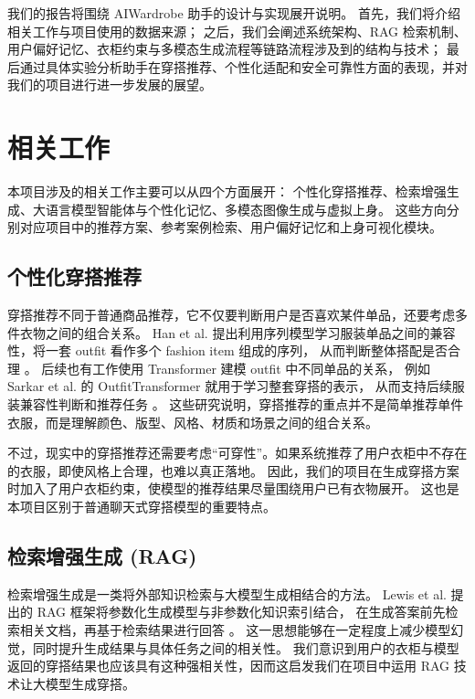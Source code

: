 \documentclass{applemlr}
\begin{document}
我们的报告将围绕 AIWardrobe 助手的设计与实现展开说明。
首先，我们将介绍相关工作与项目使用的数据来源；
之后，我们会阐述系统架构、RAG 检索机制、用户偏好记忆、衣柜约束与多模态生成流程等链路流程涉及到的结构与技术；
最后通过具体实验分析助手在穿搭推荐、个性化适配和安全可靠性方面的表现，并对我们的项目进行进一步发展的展望。


\section{相关工作}

本项目涉及的相关工作主要可以从四个方面展开：
个性化穿搭推荐、检索增强生成、大语言模型智能体与个性化记忆、多模态图像生成与虚拟上身。
这些方向分别对应项目中的推荐方案、参考案例检索、用户偏好记忆和上身可视化模块。

\subsection{个性化穿搭推荐}

穿搭推荐不同于普通商品推荐，它不仅要判断用户是否喜欢某件单品，还要考虑多件衣物之间的组合关系。
Han et al. 提出利用序列模型学习服装单品之间的兼容性，将一套 outfit 看作多个 fashion item 组成的序列，
从而判断整体搭配是否合理 \citep{han2017learning}。
后续也有工作使用 Transformer 建模 outfit 中不同单品的关系，
例如 Sarkar et al. 的 OutfitTransformer 就用于学习整套穿搭的表示，
从而支持后续服装兼容性判断和推荐任务 \citep{sarkar2023outfittransformer}。
这些研究说明，穿搭推荐的重点并不是简单推荐单件衣服，而是理解颜色、版型、风格、材质和场景之间的组合关系。

不过，现实中的穿搭推荐还需要考虑“可穿性”。如果系统推荐了用户衣柜中不存在的衣服，即使风格上合理，也难以真正落地。
因此，我们的项目在生成穿搭方案时加入了用户衣柜约束，使模型的推荐结果尽量围绕用户已有衣物展开。
这也是本项目区别于普通聊天式穿搭模型的重要特点。

\subsection{检索增强生成 (RAG)}

检索增强生成是一类将外部知识检索与大模型生成相结合的方法。
Lewis et al. 提出的 RAG 框架将参数化生成模型与非参数化知识索引结合，
在生成答案前先检索相关文档，再基于检索结果进行回答 \citep{lewis2020retrieval}。
这一思想能够在一定程度上减少模型幻觉，同时提升生成结果与具体任务之间的相关性。
我们意识到用户的衣柜与模型返回的穿搭结果也应该具有这种强相关性，因而这启发我们在项目中运用 RAG 技术让大模型生成穿搭。
\end{document}
